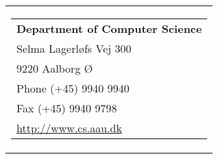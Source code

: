 \thispagestyle{empty}
\begin{titlepage}
\begin{nopagebreak}
{\samepage 
\begin{tabular}{r}
	\parbox{16cm}{
	\hfill \parbox{7cm}{\begin{tabular}{l}
		{\small \textbf{Department of Computer Science}}\\
		{\small Selma Lagerløfs Vej 300} \\
		{\small 9220 Aalborg Ø} \\
		{\small Phone (+45) 9940 9940} \\
		{\small Fax (+45) 9940 9798} \\
		{\small \url{http://www.cs.aau.dk}}
	\end{tabular}}
	}
\end{tabular}

}
\end{nopagebreak}
\end{titlepage}
